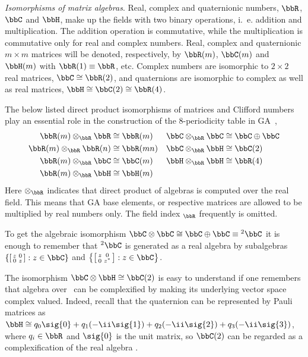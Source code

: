\begin{unit}\textit{Isomorphisms of matrix algebras}.\label{isomatalg}
Real, complex and quaternionic numbers, $\bbR$, $\bbC$ and $\bbH$,
make up the fields with two binary operations, i.~e. addition and
multiplication. The addition operation is commutative, while the
multiplication is commutative only for real and complex numbers.
Real, complex and quaternionic $m\times m$ matrices will be
denoted, respectively, by $\bbR(m)$, $\bbC(m)$ and $\bbH(m)$ with
$\bbR(1)\equiv\bbR$, etc. Complex  numbers are isomorphic
to $2\times 2$ real matrices, $\bbC\cong\bbR(2)$, %
and quaternions are isomorphic to complex as well
as real matrices, $\bbH\cong\bbC(2)\cong\bbR(4)$.%


The below listed  direct product isomorphisms of matrices and
Clifford numbers play an essential role in the construction of the
$8$-periodicity table in GA~\cite{Rausch05,Porteous95}, %
\begin{align}
\bbR(m)\otimes_{\bbR}\bbR&\cong\bbR(m)
&\bbC\otimes_{\bbR}\bbC&\cong\bbC\oplus\bbC\nonumber\\
\bbR(m)\otimes_{\bbR}\bbR(n)
&\cong\bbR(mn)&\bbC\otimes_{\bbR}\bbH&\cong\bbC(2)\nonumber\\
\bbR(m)\otimes_{\bbR}\bbC&\cong\bbC(m)
&\bbH\otimes_{\bbR}\bbH&\cong\bbR(4)\nonumber\\
\bbR(m)\otimes_{\bbR}\bbH&\cong\bbH(m)&
&\nonumber
\end{align}
Here $\otimes_{\bbR}$ indicates that direct product of algebras is
computed over the real field. This means that GA base elements, or
respective matrices are allowed to be multiplied by real numbers only. The
field index ${}_{\bbR}$ frequently  is omitted.
\end{unit}
%
\begin{example}
To get the algebraic isomorphism
$\bbC\otimes\bbC\cong\bbC\oplus\bbC\equiv {^2\bbC}$ it is enough
to remember that ${^2\bbC}$ is generated as a real algebra by
subalgebras
$\left\{\left[\begin{smallmatrix}z&0\\0&z\end{smallmatrix}\right]:z\in\bbC\right\}$
and
$\left\{\left[\begin{smallmatrix}z&0\\0&z^*\end{smallmatrix}\right]:z\in\bbC\right\}$.

The isomorphism $\bbC\otimes\bbH\cong\bbC(2)$ is easy to
understand if one remembers that algebra over \bbR\ can be
complexified by making its underlying vector space complex valued. Indeed,
recall that the quaternion can be represented by Pauli matrices as
$\bbH\cong
q_0\sig{0}+q_1(-\ii\sig{1})+q_2(-\ii\sig{2})+q_3(-\ii\sig{3})$,
where $q_i\in\bbR$ and $\sig{0}$ is the unit matrix, so $\bbC(2)$
can be regarded as a complexification of the real algebra \bbH.
\end{example}
